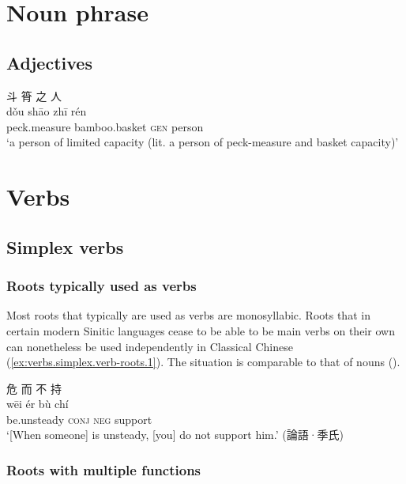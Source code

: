 \documentclass[UTF8, a4paper, oneside, scheme=plain, 12pt]{ctexrep}
\newcommand{\translate}[1]{`#1'}
\newcommand*{\category}[1]{\textsc{#1}}
\begin{document}
\chapter{Noun phrase}

\section{Adjectives}

\begin{exe}
    \ex
    \glll 斗 筲 之 人 \\
    dǒu shāo zhī rén \\
    peck.measure bamboo.basket \category{gen} person \\
    \glt\translate{a person of limited capacity (lit. a person of peck-measure and basket capacity)}
\end{exe}

\chapter{Verbs}

\section{Simplex verbs}

\subsection{Roots typically used as verbs}

Most roots that typically are used as verbs are monosyllabic.
Roots that in certain modern Sinitic languages cease to be able to be main verbs on their own 
can nonetheless be used independently in Classical Chinese (\ref{ex:verbs.simplex.verb-roots.1}).
The situation is comparable to that of nouns ().

\begin{exe}
    \ex\label{ex:verbs.simplex.verb-roots.1}
    \glll 危 而 不 持 \\
    wēi ér bù chí \\
    be.unsteady \category{conj} \category{neg} support \\
    \glt\translate{[When someone] is unsteady, [you] do not support him.} \hfill (論語·季氏)
\end{exe}



\subsection{Roots with multiple functions}
\end{document}
